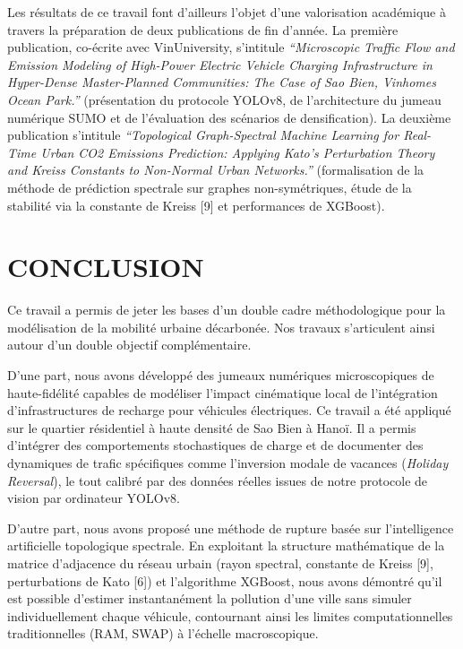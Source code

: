 \documentclass[10pt, a4paper]{article}
\begin{document}
Les résultats de ce travail font d'ailleurs l'objet d'une valorisation
académique à travers la préparation de deux publications de fin d'année.
La première publication, co-écrite avec VinUniversity, s'intitule
\emph{``Microscopic Traffic Flow and Emission Modeling of High-Power
Electric Vehicle Charging Infrastructure in Hyper-Dense Master-Planned
Communities: The Case of Sao Bien, Vinhomes Ocean Park.''} (présentation
du protocole YOLOv8, de l'architecture du jumeau numérique SUMO et de
l'évaluation des scénarios de densification). La deuxième publication
s'intitule \emph{``Topological Graph-Spectral Machine Learning for
Real-Time Urban CO2 Emissions Prediction: Applying Kato's Perturbation
Theory and Kreiss Constants to Non-Normal Urban Networks.''}
(formalisation de la méthode de prédiction spectrale sur graphes
non-symétriques, étude de la stabilité via la constante de Kreiss
{[}9{]} et performances de XGBoost).

\newpage

\section{CONCLUSION}\label{conclusion}

Ce travail a permis de jeter les bases d'un double cadre méthodologique
pour la modélisation de la mobilité urbaine décarbonée. Nos travaux
s'articulent ainsi autour d'un double objectif complémentaire.

D'une part, nous avons développé des jumeaux numériques microscopiques
de haute-fidélité capables de modéliser l'impact cinématique local de
l'intégration d'infrastructures de recharge pour véhicules électriques.
Ce travail a été appliqué sur le quartier résidentiel à haute densité de
Sao Bien à Hanoï. Il a permis d'intégrer des comportements stochastiques
de charge et de documenter des dynamiques de trafic spécifiques comme
l'inversion modale de vacances (\emph{Holiday Reversal}), le tout
calibré par des données réelles issues de notre protocole de vision par
ordinateur YOLOv8.

D'autre part, nous avons proposé une méthode de rupture basée sur
l'intelligence artificielle topologique spectrale. En exploitant la
structure mathématique de la matrice d'adjacence du réseau urbain (rayon
spectral, constante de Kreiss {[}9{]}, perturbations de Kato {[}6{]}) et
l'algorithme XGBoost, nous avons démontré qu'il est possible d'estimer
instantanément la pollution d'une ville sans simuler individuellement
chaque véhicule, contournant ainsi les limites computationnelles
traditionnelles (RAM, SWAP) à l'échelle macroscopique.
\end{document}
